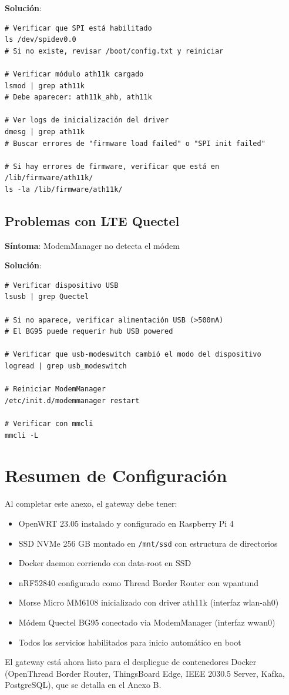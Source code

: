 \textbf{Solución}:
\begin{verbatim}
# Verificar que SPI está habilitado
ls /dev/spidev0.0
# Si no existe, revisar /boot/config.txt y reiniciar

# Verificar módulo ath11k cargado
lsmod | grep ath11k
# Debe aparecer: ath11k_ahb, ath11k

# Ver logs de inicialización del driver
dmesg | grep ath11k
# Buscar errores de "firmware load failed" o "SPI init failed"

# Si hay errores de firmware, verificar que está en /lib/firmware/ath11k/
ls -la /lib/firmware/ath11k/
\end{verbatim}

\subsection{Problemas con LTE Quectel}

\textbf{Síntoma}: ModemManager no detecta el módem

\textbf{Solución}:
\begin{verbatim}
# Verificar dispositivo USB
lsusb | grep Quectel

# Si no aparece, verificar alimentación USB (>500mA)
# El BG95 puede requerir hub USB powered

# Verificar que usb-modeswitch cambió el modo del dispositivo
logread | grep usb_modeswitch

# Reiniciar ModemManager
/etc/init.d/modemmanager restart

# Verificar con mmcli
mmcli -L
\end{verbatim}

\section{Resumen de Configuración}

Al completar este anexo, el gateway debe tener:

\begin{itemize}
    \item OpenWRT 23.05 instalado y configurado en Raspberry Pi 4
    \item SSD NVMe 256 GB montado en \texttt{/mnt/ssd} con estructura de directorios
    \item Docker daemon corriendo con data-root en SSD
    \item nRF52840 configurado como Thread Border Router con wpantund
    \item Morse Micro MM6108 inicializado con driver ath11k (interfaz wlan-ah0)
    \item Módem Quectel BG95 conectado via ModemManager (interfaz wwan0)
    \item Todos los servicios habilitados para inicio automático en boot
\end{itemize}

El gateway está ahora listo para el despliegue de contenedores Docker (OpenThread Border Router, ThingsBoard Edge, IEEE 2030.5 Server, Kafka, PostgreSQL), que se detalla en el Anexo B.

